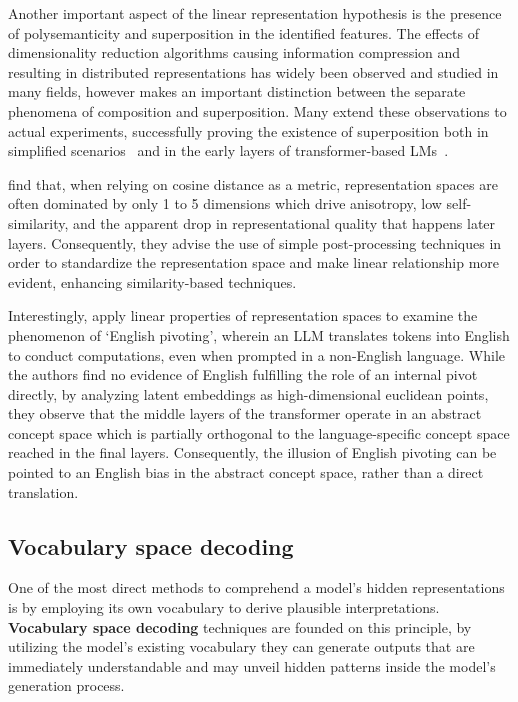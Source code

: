Another important aspect of the linear representation hypothesis is the presence of polysemanticity and superposition in the identified features.
The effects of dimensionality reduction algorithms causing information compression and resulting in distributed representations has widely been observed and studied in many fields, however \citet{olah2023} makes an important distinction between the separate phenomena of composition and superposition.
Many extend these observations to actual experiments, successfully proving the existence of superposition both in simplified scenarios~\cite{elhage2022} and in the early layers of transformer-based LMs~\cite{gurnee2023}.

\citet{timkey2021} find that, when relying on cosine distance as a metric, representation spaces are often dominated by only 1 to 5 dimensions which drive anisotropy, low self-similarity, and the apparent drop in representational quality that happens later layers.
Consequently, they advise the use of simple post-processing techniques in order to standardize the representation space and make linear relationship more evident, enhancing similarity-based techniques.

Interestingly, \citet{wendler2024} apply linear properties of representation spaces to examine the phenomenon of `English pivoting', wherein an LLM translates tokens into English to conduct computations, even when prompted in a non-English language.
While the authors find no evidence of English fulfilling the role of an internal pivot directly, by analyzing latent embeddings as high-dimensional euclidean points, they observe that the middle layers of the transformer operate in an abstract concept space which is partially orthogonal to the language-specific concept space reached in the final layers.
Consequently, the illusion of English pivoting can be pointed to an English bias in the abstract concept space, rather than a direct translation.

\subsection{Vocabulary space decoding}

One of the most direct methods to comprehend a model's hidden representations is by employing its own vocabulary to derive plausible interpretations. \textbf{Vocabulary space decoding} techniques are founded on this principle, by utilizing the model's existing vocabulary they can generate outputs that are immediately understandable and may unveil hidden patterns inside the model's generation process.

